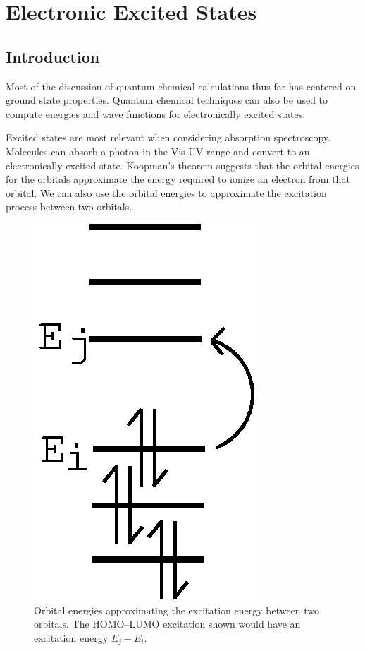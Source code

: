 \chapter{Electronic Excited States}

\graphicspath{{./Figures/ExcitedStates/}}

\section{Introduction}
Most of the discussion of quantum chemical calculations thus far has
centered on ground state properties. Quantum chemical techniques can
also be used to compute energies and wave functions for electronically
excited states.

Excited states are most relevant when considering absorption
spectroscopy. Molecules can absorb a photon in the Vis-UV range and
convert to an electronically excited state. 
Koopman's theorem suggests that the orbital energies for the orbitals
approximate the energy required to ionize an electron from that
orbital. We can also use the orbital energies to approximate the
excitation process between two orbitals.

\begin{figure}
\begin{center}
\includegraphics[scale=0.6]{koopman-excite}
\end{center}
\caption{Orbital energies approximating the excitation energy between
two orbitals. The HOMO--LUMO excitation shown would have an excitation energy $E_j-E_i$.} 
\label{koopman-excite}
\end{figure}

